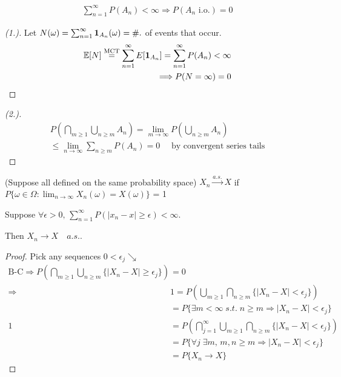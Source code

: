\documentclass[11pt]{article}
\begin{document}
\begin{theorem}
    \begin{align*}
        \sum_{n=1}^{\infty}P(A_n) < \infty \Longrightarrow P(A_n \text{ i.o.}) = 0
    \end{align*}
\end{theorem}
\begin{proof}[(1.)]
    Let $N(\omega) = \sum_{n=1}^{\infty}\bm{1}_{A_n}(\omega) = \#. $ of events that occur.
    \begin{align*}
        \mathbb{E}[N] \overset{\text{MCT}}{=} \sum_{n=1}^{\infty}E[\bm{1}_{A_n}] = \sum_{n=1}^{\infty}P(A_n) < \infty\\
        \Longrightarrow P(N=\infty) = 0
    \end{align*}
\end{proof}
\begin{proof}[(2.)]
    \begin{align*}
        P(\bigcap _{m\ge 1}\bigcup _{n\ge m} A_n) = \lim_{m \to \infty}P(\bigcup_{n\ge m}A_n)\\
        \le \lim_{n \to \infty}\sum_{n\ge m}P(A_n) = 0 \quad \text{ by convergent series tails}
    \end{align*}
\end{proof}
\begin{definition}
    (Suppose all defined on the same probability space) $X_n \xrightarrow{a.s.} X$ if $P\{ 
        \omega \in \Omega: \lim_{n \to \infty}X_n(\omega) = X(\omega)
     \}$ = 1
\end{definition}
\begin{lemma}
    Suppose $\forall  \epsilon > 0, \, \sum_{n=1}^{\infty}P(|x_n-x| \ge \epsilon) < \infty$.

    Then $X_n \longrightarrow X \quad a.s.$.
\end{lemma}
\begin{proof}
    Pick any sequences $0 < \epsilon_{j} \searrow$
    \begin{align*}
        \text{B-C} \Longrightarrow P(\bigcap _{m\ge 1}\bigcup _{n\ge m}\{ |X_n-X| \ge \epsilon_j \}) &= 0\\
        \Longrightarrow &1=  P(\bigcup_{m\ge 1}\bigcap_{n\ge m}\{ |X_n - X| < \epsilon_j \})\\
        &= P\{ \exists m < \infty \; s.t. \; n\ge m \Longrightarrow
        |X_n-X| < \epsilon_j \}\\
        1 &= P(\bigcap _{j=1}^{\infty}\bigcup _{m\ge 1}\bigcap_{n\ge m}\{ |X_n-X| < \epsilon_j \})\\
        &= P\{ \forall j \;\exists m,\, m,n \ge m \Longrightarrow|X_n-X| < \epsilon_j \}\\
        &= P\{ X_n \to X \}
    \end{align*}
\end{proof}
\end{document}
